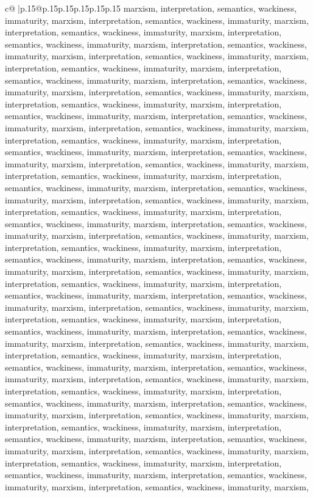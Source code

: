 \documentclass{article}
\begin{document}
{\begin{supertabular}{c@{$\;$}|p{.15\linewidth}@{}p{.15\linewidth}p{.15\linewidth}p{.15\linewidth}p{.15\linewidth}p{.15\linewidth}}
{{{marxism, interpretation, semantics, wackiness, immaturity, marxism, interpretation, semantics, wackiness, immaturity, marxism, interpretation, semantics, wackiness, immaturity, marxism, interpretation, semantics, wackiness, immaturity, marxism, interpretation, semantics, wackiness, immaturity, marxism, interpretation, semantics, wackiness, immaturity, marxism, interpretation, semantics, wackiness, immaturity, marxism, interpretation, semantics, wackiness, immaturity, marxism, interpretation, semantics, wackiness, immaturity, marxism, interpretation, semantics, wackiness, immaturity, marxism, interpretation, semantics, wackiness, immaturity, marxism, interpretation, semantics, wackiness, immaturity, marxism, interpretation, semantics, wackiness, immaturity, marxism, interpretation, semantics, wackiness, immaturity, marxism, interpretation, semantics, wackiness, immaturity, marxism, interpretation, semantics, wackiness, immaturity, marxism, interpretation, semantics, wackiness, immaturity, marxism, interpretation, semantics, wackiness, immaturity, marxism, interpretation, semantics, wackiness, immaturity, marxism, interpretation, semantics, wackiness, immaturity, marxism, interpretation, semantics, wackiness, immaturity, marxism, interpretation, semantics, wackiness, immaturity, marxism, interpretation, semantics, wackiness, immaturity, marxism, interpretation, semantics, wackiness, immaturity, marxism, interpretation, semantics, wackiness, immaturity, marxism, interpretation, semantics, wackiness, immaturity, marxism, interpretation, semantics, wackiness, immaturity, marxism, interpretation, semantics, wackiness, immaturity, marxism, interpretation, semantics, wackiness, immaturity, marxism, interpretation, semantics, wackiness, immaturity, marxism, interpretation, semantics, wackiness, immaturity, marxism, interpretation, semantics, wackiness, immaturity, marxism, interpretation, semantics, wackiness, immaturity, marxism, interpretation, semantics, wackiness, immaturity, marxism, interpretation, semantics, wackiness, immaturity, marxism, interpretation, semantics, wackiness, immaturity, marxism, interpretation, semantics, wackiness, immaturity, marxism, interpretation, semantics, wackiness, immaturity, marxism, interpretation, semantics, wackiness, immaturity, marxism, interpretation, semantics, wackiness, immaturity, marxism, interpretation, semantics, wackiness, immaturity, marxism, interpretation, semantics, wackiness, immaturity, marxism, interpretation, semantics, wackiness, immaturity, marxism, interpretation, semantics, wackiness, immaturity, marxism, interpretation, semantics, wackiness, immaturity, marxism, interpretation, semantics, wackiness, immaturity, marxism, interpretation, semantics, wackiness, immaturity, marxism, interpretation, semantics, wackiness, immaturity, marxism, interpretation, semantics, wackiness, immaturity, marxism, interpretation, semantics, wackiness, immaturity, marxism, interpretation, semantics, wackiness, immaturity, marxism, interpretation, semantics, wackiness, immaturity, marxism, interpretation, semantics, wackiness, immaturity, marxism, interpretation, semantics, wackiness, immaturity, marxism, }}}
\end{supertabular}}
\end{document}
